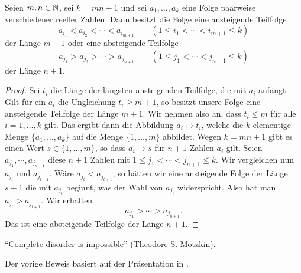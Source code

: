 \begin{thm} 
	Seien $m, n \in \mathbb{N}$, sei $k=mn+1$ und sei $a_1,\ldots,a_k$ eine Folge paarweise verschiedener reeller Zahlen. Dann besitzt die Folge eine ansteigende Teilfolge 
	\[
			a_{i_1}  < a_{i_2} < \cdots < a_{i_{m+1}} \qquad (1 \le i_1 < \cdots < i_{m+1} \le k)
	\]
	der Länge $m+1$ oder eine absteigende Teilfolge 
	\[
		 a_{j_1} > a_{j_2} > \cdots > a_{j_{n+1}} \qquad (1 \le j_1 < \cdots < j_{n+1} \le k)
	\]
	der  Länge $n+1$. 
\end{thm} 
\begin{proof}
	Sei $t_i$ die Länge der längsten ansteigenden Teilfolge, die mit $a_i$ anfängt. Gilt für ein $a_i$ die Ungleichung $t_i \ge m+1$, so besitzt unsere Folge eine ansteigende Teilfolge der Länge $m+1$. Wir nehmen also an, dass $t_i \le m$ für alle $i=1,\ldots, k$ gilt. Das ergibt dann die Abbildung $a_i \mapsto t_i$, welche die $k$-elementige Menge $\{a_1,\ldots,a_k\}$ auf die Menge $\{1,\ldots,m\}$ abbildet.
	Wegen $k=mn+1$ gibt es einen Wert $s \in \{1,\ldots,m\}$, so dass $a_i \mapsto s$ für $n+1$ Zahlen $a_i$ gilt. Seien $a_{j_1}, \cdots ,  a_{j_{n+1}}$ diese $n+1$ Zahlen mit $1 \le j_1 < \cdots < j_{n+1} \le k$. Wir vergleichen nun $a_{j_t}$ und $a_{j_{t+1}}$. Wäre $a_{j_t} < a_{j_{t+1}}$, so hätten wir eine ansteigende Folge der Länge $s+1$ die mit $a_{j_t}$ beginnt, was der Wahl von $a_{j_t}$ widerspricht. Also hat man $a_{j_t} > a_{j_{t+1}}$. Wir erhalten 
	\[
		a_{j_1} > \cdots > a_{j_{n+1}}.
	\]
	Das ist eine absteigende Teilfolge der Länge $n+1$. 
\end{proof} 

\begin{bem}
	``Complete disorder is impossible'' (Theodore S. Motzkin). 
\end{bem} 

\begin{bem}
	Der vorige Beweis basiert auf der Präsentation in \cite{AZ02}. 
\end{bem} 



